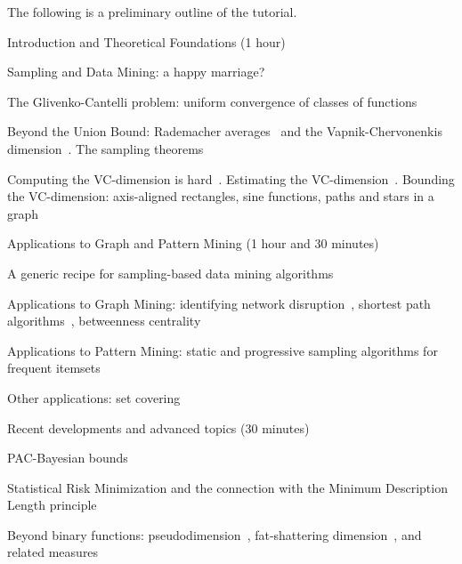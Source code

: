 \documentclass[11pt]{article}
\begin{document}
\medskip
The following is a preliminary outline of the tutorial.

\begin{enumerate*}
	\item Introduction and Theoretical Foundations (1 hour)
		\begin{enumerate*}
			\item Sampling and Data Mining: a happy marriage?
			\item The Glivenko-Cantelli problem: uniform convergence of
				classes of functions~\citep{Vapnik99}
			\item Beyond the Union Bound: Rademacher
				averages~\citep{Koltchinskii01} and the Vapnik-Chervonenkis
				dimension~\citep{VapnikC71}. The sampling theorems~\citep{AlonS08}
			\item Computing the VC-dimension is hard~\citep{PapadimitriouY96}.
				Estimating the VC-dimension~\citep{VapnikLLC94,ShaoCL00}.
				Bounding the VC-dimension: axis-aligned rectangles, sine functions,
				paths and stars in a graph~\citep{KranakisKRUW97}
		\end{enumerate*}
	\item Applications to Graph and Pattern Mining (1 hour and 30 minutes)
		\begin{enumerate*}
			\item A generic recipe for sampling-based data mining algorithms
			\item Applications to Graph Mining: identifying network
				disruption~\citep{KleinbergSS08}, shortest path
				algorithms~\citep{AbrahamDFGW11}, betweenness centrality~\citep{RiondatoK14}
			\item Applications to Pattern Mining: static and progressive
				sampling algorithms for frequent itemsets~\citep{RiondatoU14,RiondatoU15-ext}
			\item Other applications: set covering~\citep{BronnimannG94}
		\end{enumerate*}
	\item Recent developments and advanced topics (30 minutes)
		\begin{enumerate*}
			\item PAC-Bayesian bounds~\citep{BoucheronBL05,ShalevSBD14}
			\item Statistical Risk Minimization and the connection with the Minimum
				Description Length principle~\citep{Vapnik99}
			\item Beyond binary functions: pseudodimension~\citep{Pollard1984}, fat-shattering
				dimension~\citep{KearnsS90}, and related measures~\citep{MohriRT12}
		\end{enumerate*}
\end{enumerate*}
\end{document}
